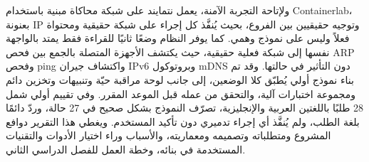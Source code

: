 \begin{arabicpar}
ولإتاحة التجربة الآمنة، يعمل نتمايند على شبكة محاكاة مبنية باستخدام
Containerlab، بعنونة IP وتوجيه حقيقيين بين الفروع، بحيث يُنفَّذ كل إجراء
على شبكة حقيقية ومحتواة فعلاً وليس على نموذج وهمي. كما يوفر النظام وضعًا
ثانيًا للقراءة فقط يمتد بالواجهة نفسها إلى شبكة فعلية حقيقية، حيث يكتشف
الأجهزة المتصلة بالجمع بين فحص ARP وفحص ping واكتشاف جيران IPv6 وبروتوكول
mDNS دون التأثير في حالتها. وقد تم بناء نموذج أولي يُطبّق كلا الوضعين، إلى
جانب لوحة مراقبة حيّة وتنبيهات وتخزين دائم ومجموعة اختبارات آلية، والتحقق من
عمله قبل الموعد المقرر. وفي تقييم أولي شمل 28 طلبًا باللغتين العربية
والإنجليزية، تصرّف النموذج بشكل صحيح في 27 حالة، وردّ دائمًا بلغة الطلب، ولم
يُنفَّذ أي إجراء تدميري دون تأكيد المستخدم. ويغطي هذا التقرير دوافع المشروع ومتطلباته وتصميمه
ومعماريته، والأسباب وراء اختيار الأدوات والتقنيات المستخدمة في بنائه، وخطة
العمل للفصل الدراسي الثاني.
\end{arabicpar}

\cleardoublepage
\tableofcontents
\cleardoublepage
\listoftables
\cleardoublepage
\listoffigures


